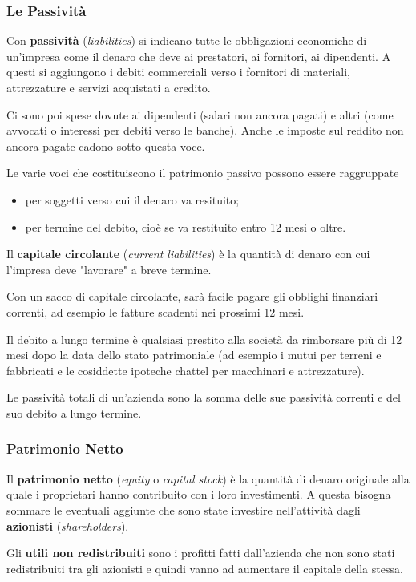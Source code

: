 \documentclass[a4paper,portrait,12pt]{article}
\theoremstyle{definition}
\begin{document}
\subsubsection{Le Passività}
Con \textbf{passività} (\emph{liabilities}) si indicano tutte le obbligazioni economiche di un'impresa come il denaro che deve ai prestatori, ai fornitori, ai dipendenti.
A questi si aggiungono i debiti commerciali verso i fornitori di materiali, attrezzature e servizi acquistati a credito.

Ci sono poi spese dovute ai dipendenti (salari non ancora pagati) e altri (come avvocati o interessi per debiti verso le banche).
Anche le imposte sul reddito non ancora pagate cadono sotto questa voce.

Le varie voci che costituiscono il patrimonio passivo possono essere raggruppate
\begin{itemize}
\item per soggetti verso cui il denaro va resituito;
\item per termine del debito, cioè se va restituito entro 12 mesi o oltre.
\end{itemize}

Il \textbf{capitale circolante} (\emph{current liabilities}) è la quantità di denaro con cui l'impresa deve "lavorare" a breve termine.

Con un sacco di capitale circolante, sarà facile pagare gli obblighi finanziari correnti, ad esempio le fatture scadenti nei prossimi 12 mesi.

Il debito a lungo termine è qualsiasi prestito alla società da rimborsare più di 12 mesi dopo la data dello stato patrimoniale (ad esempio i mutui per terreni e fabbricati e le cosiddette ipoteche chattel per macchinari e attrezzature).

Le passività totali di un'azienda sono la somma delle sue passività correnti e del suo debito a lungo termine.

\subsubsection{Patrimonio Netto}

Il \textbf{patrimonio netto} (\emph{equity} o \emph{capital stock}) è la quantità di denaro originale alla quale i proprietari hanno contribuito con i loro investimenti. A questa bisogna sommare le eventuali aggiunte che sono state investire nell'attività dagli \textbf{azionisti} (\emph{shareholders}).

Gli \textbf{utili non redistribuiti} sono i profitti fatti dall'azienda che non sono stati redistribuiti tra gli azionisti e quindi vanno ad aumentare il capitale della stessa.
\end{document}
